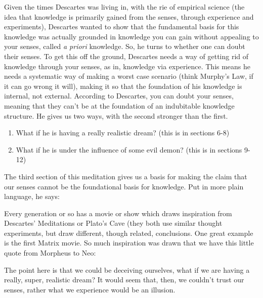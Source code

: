 Given the times Descartes was living in, with the rie of empirical science (the idea that knowledge is primarily gained from the senses, through experience and experiments), Descartes wanted to show that the fundamental basis for this knowledge was actually grounded in knowledge you can gain without appealing to your senses, called \emph{a priori} knowledge. So, he turns to whether one can doubt their senses. To get this off the ground, Descartes needs a way of getting rid of knowledge through your senses, as in, knowledge via experience. This means he needs a systematic way of making a worst case scenario (think Murphy's Law, if it can go wrong it will), making it so that the foundation of his knowledge is internal, not external.  According to Descartes, you can doubt your senses, meaning that they can't be at the foundation of an indubitable knowledge structure. He gives us two ways, with the second stronger than the first.
\begin{enumerate}
    \item What if he is having a really realistic dream? (this is in sections 6-8)
    \item What if he is under the influence of some evil demon? (this is in sections 9-12)
\end{enumerate}
The third section of this meditation gives us a basis for making the claim that our senses cannot be the foundational basis for knowledge. Put in more plain language, he says:


Every generation or so has a movie or show which draws inspiration from Descartes' Meditations or Plato's Cave (they both use similar thought experiments, but draw different, though related, conclusions. One great example is the first Matrix movie. So much inspiration was drawn that we have this little quote from Morpheus to Neo:


The point here is that we could be deceiving ourselves, what if we are having a really, super, realistic dream? It would seem that, then, we couldn't trust our senses, rather what we experience would be an illusion.

